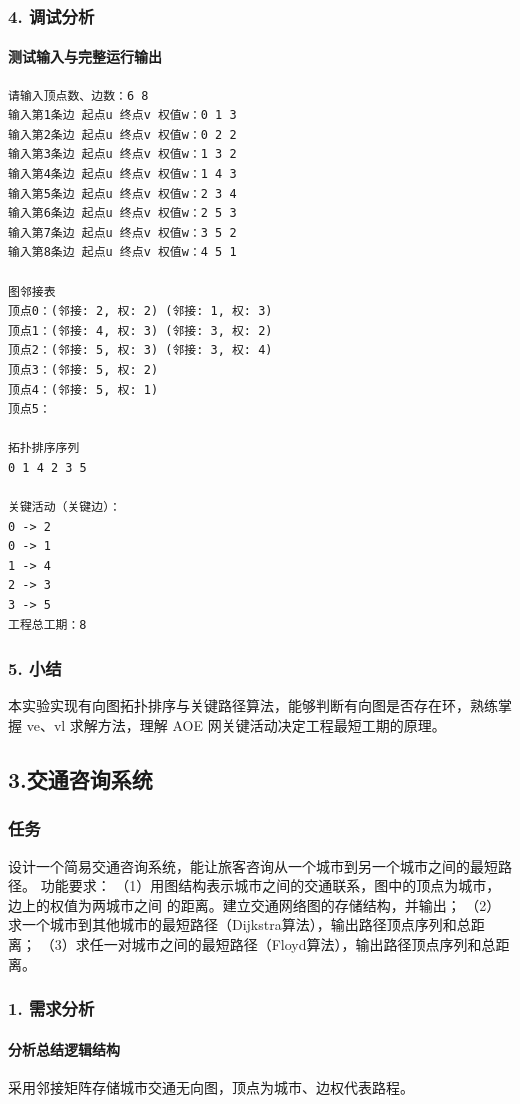 \documentclass{ctexart}
\begin{document}
\subsubsection{4. 调试分析}
\paragraph{测试输入与完整运行输出}
\begin{verbatim}
请输入顶点数、边数：6 8
输入第1条边 起点u 终点v 权值w：0 1 3
输入第2条边 起点u 终点v 权值w：0 2 2
输入第3条边 起点u 终点v 权值w：1 3 2
输入第4条边 起点u 终点v 权值w：1 4 3
输入第5条边 起点u 终点v 权值w：2 3 4
输入第6条边 起点u 终点v 权值w：2 5 3
输入第7条边 起点u 终点v 权值w：3 5 2
输入第8条边 起点u 终点v 权值w：4 5 1

图邻接表
顶点0：(邻接: 2, 权: 2) (邻接: 1, 权: 3) 
顶点1：(邻接: 4, 权: 3) (邻接: 3, 权: 2) 
顶点2：(邻接: 5, 权: 3) (邻接: 3, 权: 4) 
顶点3：(邻接: 5, 权: 2) 
顶点4：(邻接: 5, 权: 1) 
顶点5：

拓扑排序序列
0 1 4 2 3 5 

关键活动（关键边）：
0 -> 2
0 -> 1
1 -> 4
2 -> 3
3 -> 5
工程总工期：8

\end{verbatim}

\subsubsection{5. 小结}
本实验实现有向图拓扑排序与关键路径算法，能够判断有向图是否存在环，熟练掌握 ve、vl 求解方法，理解 AOE 网关键活动决定工程最短工期的原理。

\subsection {3.交通咨询系统}
\subsubsection {任务}
设计一个简易交通咨询系统，能让旅客咨询从一个城市到另一个城市之间的最短路径。 功能要求： （1）用图结构表示城市之间的交通联系，图中的顶点为城市，边上的权值为两城市之间 的距离。建立交通网络图的存储结构，并输出；
（2）求一个城市到其他城市的最短路径（Dijkstra算法），输出路径顶点序列和总距离； （3）求任一对城市之间的最短路径（Floyd算法），输出路径顶点序列和总距离。
\subsubsection{1. 需求分析}
\paragraph{分析总结逻辑结构}
采用邻接矩阵存储城市交通无向图，顶点为城市、边权代表路程。
\end{document}
